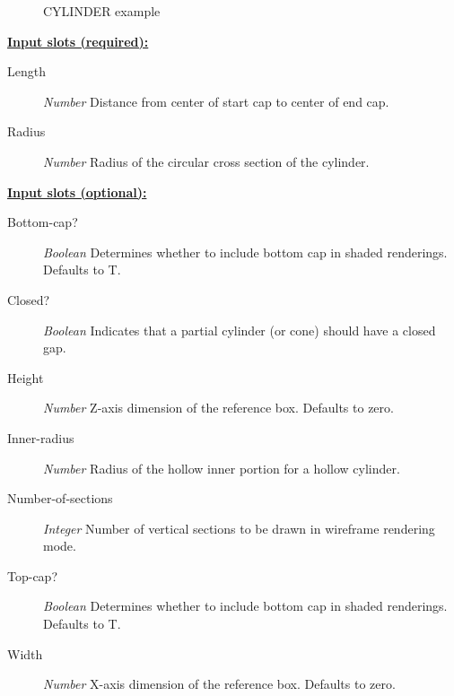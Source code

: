 \documentclass [11pt]{book}
\begin{document}
\begin{itemize}
\begin{figure}
\caption{CYLINDER example}

\label{fig:CYLINDER}

\end{figure}





\textbf{
\underline{Input slots (required):}}

\begin{description}

\item [Length]
\emph{Number} Distance from center of start cap to center of end cap.


\item [Radius]
\emph{Number} Radius of the circular cross section of the cylinder.


\end{description}






\textbf{
\underline{Input slots (optional):}}

\begin{description}

\item [Bottom-cap?]
\emph{Boolean} Determines whether to include bottom cap in shaded renderings. Defaults to T.


\item [Closed?]
\emph{Boolean} Indicates that a partial cylinder (or cone) should have a closed gap.


\item [Height]
\emph{Number} Z-axis dimension of the reference box. Defaults to zero.


\item [Inner-radius]
\emph{Number} Radius of the hollow inner portion for a hollow cylinder.


\item [Number-of-sections]
\emph{Integer} Number of vertical sections to be drawn in wireframe rendering mode.


\item [Top-cap?]
\emph{Boolean} Determines whether to include bottom cap in shaded renderings. Defaults to T.


\item [Width]
\emph{Number} X-axis dimension of the reference box. Defaults to zero.



\end{description}
\end{itemize}
\end{document}
